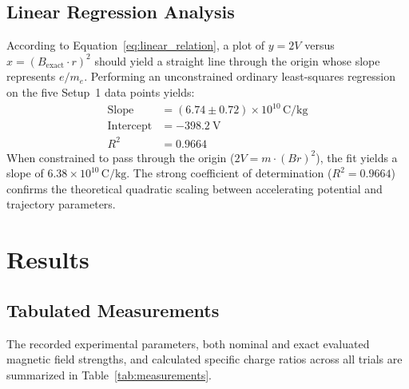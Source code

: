 \documentclass[journal]{IEEEtran}
\begin{document}
\subsection{Linear Regression Analysis}
According to Equation~\eqref{eq:linear_relation}, a plot of $y = 2V$ versus $x = (B_{\text{exact}} \cdot r)^2$ should yield a straight line through the origin whose slope represents $e/m_e$. Performing an unconstrained ordinary least-squares regression on the five Setup~1 data points yields:
\begin{align}
    \text{Slope} &= (6.74 \pm 0.72) \times 10^{10}\,\mathrm{C/kg} \\
    \text{Intercept} &= -\SI{398.2}{\volt} \\
    R^2 &= 0.9664
\end{align}
When constrained to pass through the origin ($2V = m \cdot (Br)^2$), the fit yields a slope of $6.38 \times 10^{10}\,\mathrm{C/kg}$. The strong coefficient of determination ($R^2 = 0.9664$) confirms the theoretical quadratic scaling between accelerating potential and trajectory parameters.

\section{Results}

\subsection{Tabulated Measurements}
The recorded experimental parameters, both nominal and exact evaluated magnetic field strengths, and calculated specific charge ratios across all trials are summarized in Table~\ref{tab:measurements}.

\begin{table}[t]
    \centering
    \caption{Experimental Deflection Measurements, Exact Magnetic Fields, and Specific Charge Calculations}
    \label{tab:measurements}
\end{table}
\end{document}
